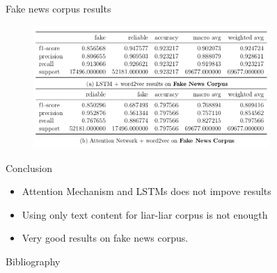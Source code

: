\documentclass{beamer}
\begin{document}
	\begin{frame}{Fake news corpus results}
		\begin{figure}
		\centering
			\includegraphics[width=0.8\textwidth]{res5.png}
		\end{figure}
	\end{frame}
	\begin{frame}{Conclusion}
		\begin{itemize}
			\item Attention Mechanism and LSTMs does not impove results
			\item Using only text content for liar-liar corpus is not enougth
			\item Very good results on fake news corpus.
		\end{itemize}
	\end{frame}
  \begin{frame}[allowframebreaks]{Bibliography}
    
	
	\note{}
  \end{frame}
\end{document}
